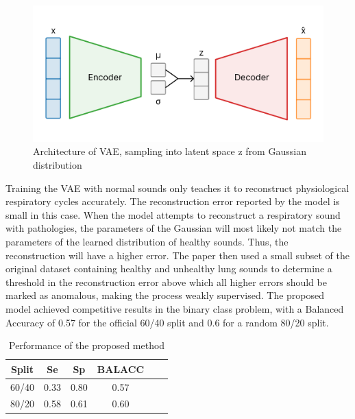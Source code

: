 \begin{figure}[h!]
    \includegraphics[width=\linewidth]{images/vae}
    \caption{
    Architecture of VAE, sampling into latent space z from Gaussian distribution
}
\label{fig:archvae}
\end{figure}


Training the VAE with normal sounds only teaches it to reconstruct physiological respiratory cycles accurately. The reconstruction error reported by the model is small in this case. When the model attempts to reconstruct a respiratory sound with pathologies, the parameters of the Gaussian will most likely not match the parameters of the learned distribution of healthy sounds. Thus, the reconstruction will have a higher error. The paper then used a small subset of the original dataset containing healthy and unhealthy lung sounds to determine a threshold in the reconstruction error above which all higher errors should be marked as anomalous, making the process weakly supervised. The proposed model achieved competitive results in the binary class problem, with a Balanced Accuracy of 0.57 for the official 60/40 split and 0.6 for a random 80/20 split.

\begin{table}[h!]
    \centering
    \caption{Performance of the proposed method}
    \begin{tabular}{cccccc}
    \toprule
    \textbf{Split} & \textbf{Se} & \textbf{Sp} & \textbf{BALACC} \\
    \midrule
    60/40 & 0.33 & 0.80 & 0.57 \\
    80/20 & 0.58 & 0.61 & 0.60 \\
    \bottomrule
    \end{tabular}
\end{table}


